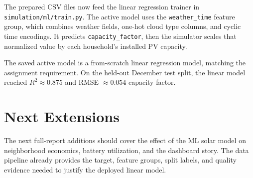 \documentclass[paper=a4, fontsize=11pt]{scrartcl}
\numberwithin{table}{section}
\begin{document}
The prepared CSV files now feed the linear regression trainer in
\texttt{simulation/ml/train.py}. The active model uses the
\texttt{weather\_time} feature group, which combines weather fields,
one-hot cloud type columns, and cyclic time encodings. It predicts
\texttt{capacity\_factor}, then the simulator scales that normalized value by
each household's installed PV capacity.

The saved active model is a from-scratch linear regression model, matching the
assignment requirement. On the held-out December test split, the linear model
reached \(R^2 \approx 0.875\) and RMSE \(\approx 0.054\) capacity factor.

\section{Next Extensions}

The next full-report additions should cover the effect of the ML solar model on
neighborhood economics, battery utilization, and the dashboard story. The data
pipeline already provides the target, feature groups, split labels, and quality
evidence needed to justify the deployed linear model.
\end{document}
